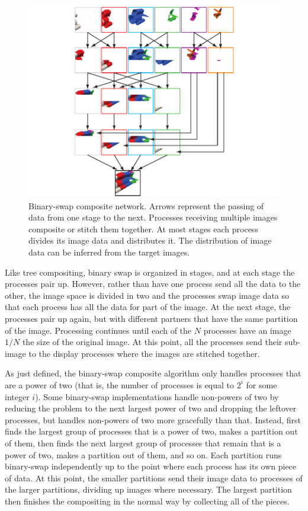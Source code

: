 \begin{figure}
  \centering
  \includegraphics{images/BinarySwap}
  \caption[Binary-swap composite network.]{Binary-swap composite network.
    Arrows represent the passing of data from one stage to the next.
    Processes receiving multiple images composite or stitch them together.
    At most stages each process divides its image data and distributes it.
    The distribution of image data can be inferred from the target images.}
  \label{fig:BinarySwap}
\end{figure}

Like tree compositing, binary swap is organized in stages, and at each
stage the processes pair up.  However, rather than have one process send
all the data to the other, the image space is divided in two and the
processes swap image data so that each process has all the data for part of
the image.  At the next stage, the processes pair up again, but with
different partners that have the same partition of the image.  Processing
continues until each of the $N$ processes have an image $1/N$ the size of
the original image.  At this point, all the processes send their sub-image
to the display processes where the images are stitched together.

As just defined, the binary-swap composite algorithm only handles processes
that are a power of two (that is, the number of processes is equal to $2^i$
for some integer $i$).  Some binary-swap implementations handle non-powers
of two by reducing the problem to the next largest power of two and
dropping the leftover processes, but \IceT handles non-powers of two more
gracefully than that.  Instead, \IceT first finds the largest group of
processes that is a power of two, makes a partition out of them, then finds
the next largest group of processes that remain that is a power of two,
makes a partition out of them, and so on.  Each partition runs binary-swap
independently up to the point where each process has its own piece of data.
At this point, the smaller partitions send their image data to processes of
the larger partitions, dividing up images where necessary.  The largest
partition then finishes the compositing in the normal way by collecting all
of the pieces.

